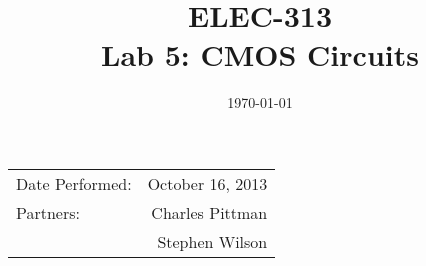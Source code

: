 \documentclass{article}
\author{}
\title{ELEC-313 \\ Lab 5: CMOS Circuits\\ }
\date{\today}
\begin{document}
\maketitle

\begin{center}
  \begin{tabular}{lr}
    Date Performed: & October 16, 2013 \\
    Partners:       & Charles Pittman    \\
    & Stephen Wilson     \\
  \end{tabular}
\end{center}

\newpage

\tableofcontents
\listoffigures
\listoftables
\newpage

\renewcommand{\labelenumi}{\alph{enumi}.}
\end{document}
